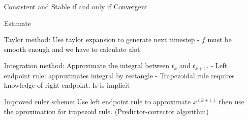 Consistent and Stable if and only if Convergent


Estimate



Taylor method: Use taylor expansion to generate next timestep
- $f$ must be smooth enough and we have to calculate alot.

Integration method: Approximate the integral between $t_k$ and $t_{k+1}$.
- Left endpoint rule: approximates integral by rectangle
- Trapezoidal rule requires knowledge of right endpoint. Is is implicit

Improved euler scheme: Use left endpoint rule to approximate $x^{(k+1)}$ then use the aproximation for trapezoid rule.
(Predictor-corrector algorithm)
